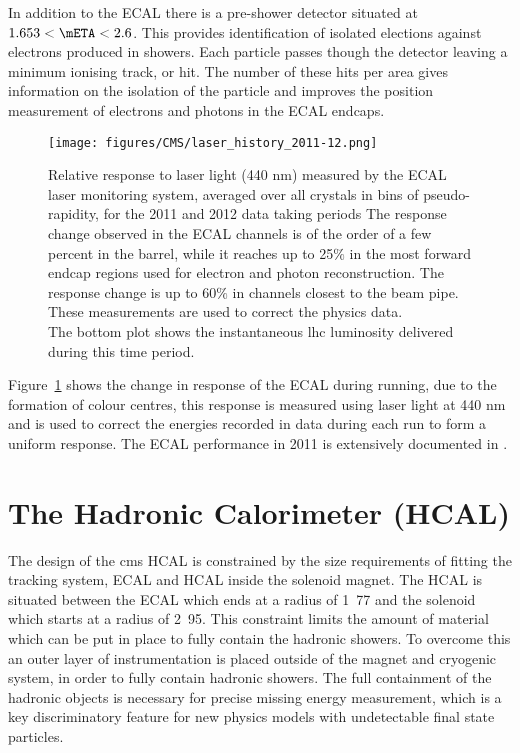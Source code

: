 In addition to the ECAL there is a pre-shower detector situated at $1.653 <
\mETA < 2.6$. This provides identification of isolated elections against
electrons produced in showers. Each particle passes though the detector leaving
a minimum ionising track, or hit. The number of these hits per area gives
information on the isolation of the particle and improves the position
measurement of electrons and photons in the ECAL endcaps.
\begin{figure}[ht]
  \centering
    \texttt{[image: figures/CMS/laser\_history\_2011-12.png]}
  \caption{Relative response to laser light (440 nm) measured by the ECAL laser
monitoring system, averaged over all crystals in bins of pseudo-rapidity, for
the 2011 and 2012 data taking periods
The response change observed in the ECAL channels is of the order of a few
percent in the barrel, while it reaches up to 25$\%$ in the most forward endcap
regions used for electron and photon reconstruction. The response change is up
to 60$\%$ in channels closest to the beam pipe. These measurements are used to
correct the physics data. \\ The bottom plot shows the instantaneous \ac{lhc}
luminosity delivered during this time period.\cite{CMS-DP-2012-015}}
  \label{fig:figures_CMS_laser_history_2011-12}
\end{figure}

Figure~\ref{fig:figures_CMS_laser_history_2011-12} shows the change in response
of the ECAL during running, due to the formation of colour centres, this
response is measured using laser light at 440 nm and is used to correct the
energies recorded in data during each run to form a uniform response.
The ECAL performance in 2011 is extensively documented in \cite{CMS-DP-2012-002}.

\section{The Hadronic Calorimeter (HCAL)} %
\label{sec:the_hadronic_calorimeter}
The design of the \ac{cms} HCAL is constrained by the size requirements of
fitting the tracking system, ECAL and HCAL inside the solenoid magnet. The HCAL
is situated between the ECAL which ends at a radius of \unit{1.77}{\meter} and
the solenoid which starts at a radius of \unit{2.95}{\meter}. This constraint
limits the amount of material which can be put in place to fully contain the
hadronic showers. To overcome this an outer layer of instrumentation is placed
outside of the magnet and cryogenic system, in order to fully contain hadronic 
showers. The full containment of the hadronic objects is necessary for precise 
missing energy measurement, which is a key discriminatory feature for new 
physics models with undetectable final state particles.

